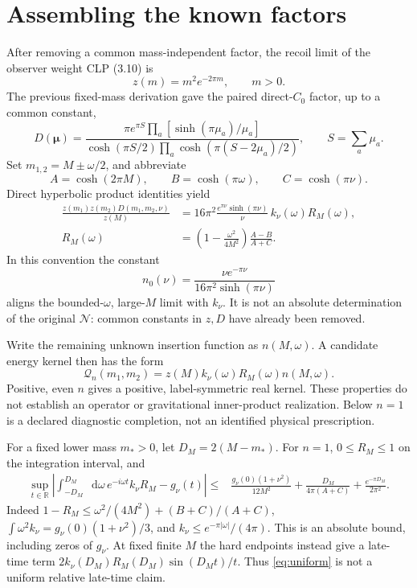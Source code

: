 \documentclass[11pt,a4paper]{article}
\newcommand{\dd}{\mathop{}\!\mathrm d}
\newcommand{\Q}{\mathcal Q}
\begin{document}
\section{Assembling the known factors}
After removing a common mass-independent factor, the recoil
limit of the observer weight CLP (3.10) is
\begin{equation}
z(m)=m^2e^{-2\pi m},\qquad m>0.
\end{equation}
The previous fixed-mass derivation gave the paired direct-\(C_0\)
factor, up to a common constant,
\begin{equation}
D(\boldsymbol\mu)=
\frac{\pi e^{\pi S}\prod_a[\sinh(\pi\mu_a)/\mu_a]}
{\cosh(\pi S/2)\prod_a\cosh(\pi(S-2\mu_a)/2)},\qquad S=\sum_a\mu_a .
\end{equation}
Set \(m_{1,2}=M\pm\omega/2\), and abbreviate
\[
A=\cosh(2\pi M),\qquad B=\cosh(\pi\omega),\qquad C=\cosh(\pi\nu).
\]
Direct hyperbolic product identities yield
\begin{align}
\frac{z(m_1)z(m_2)D(m_1,m_2,\nu)}{z(M)}
&=16\pi^2\frac{e^{\pi\nu}\sinh(\pi\nu)}{\nu}\,
k_\nu(\omega)R_M(\omega),\\
R_M(\omega)&=\left(1-\frac{\omega^2}{4M^2}\right)\frac{A-B}{A+C}.
\label{eq:R}
\end{align}
In this convention the constant
\begin{equation}
n_0(\nu)=\frac{\nu e^{-\pi\nu}}{16\pi^2\sinh(\pi\nu)}
\end{equation}
aligns the bounded-\(\omega\), large-\(M\) limit with \(k_\nu\).
It is not an absolute determination of the original
\(\mathcal N\): common constants in \(z,D\) have already been removed.

Write the remaining unknown insertion function as \(n(M,\omega)\).
A candidate energy kernel then has the form
\begin{equation}
\Q_n(m_1,m_2)=z(M)k_\nu(\omega)R_M(\omega)n(M,\omega).
\label{eq:Q}
\end{equation}
Positive, even \(n\) gives a positive, label-symmetric real kernel.
These properties do not establish an operator or gravitational
inner-product realization. Below \(n=1\) is a declared diagnostic
completion, not an identified physical prescription.

For a fixed lower mass \(m_*>0\), let \(D_M=2(M-m_*)\).
For \(n=1\), \(0\le R_M\le1\) on the integration interval, and
\begin{align}
\sup_{t\in\mathbb R}\left|
\int_{-D_M}^{D_M}\dd\omega\,e^{-i\omega t}k_\nu R_M-g_\nu(t)\right|
\le{}&
\frac{g_\nu(0)(1+\nu^2)}{12M^2}
+\frac{D_M}{4\pi(A+C)}
+\frac{e^{-\pi D_M}}{2\pi^2}.\label{eq:uniform}
\end{align}
Indeed \(1-R_M\le\omega^2/(4M^2)+(B+C)/(A+C)\),
\(\int\omega^2k_\nu=g_\nu(0)(1+\nu^2)/3\), and
\(k_\nu\le e^{-\pi|\omega|}/(4\pi)\).
This is an absolute bound, including zeros of \(g_\nu\).
At fixed finite \(M\) the hard endpoints instead give a late-time
term \(2k_\nu(D_M)R_M(D_M)\sin(D_Mt)/t\).
Thus \eqref{eq:uniform} is not a uniform relative late-time claim.
\end{document}
